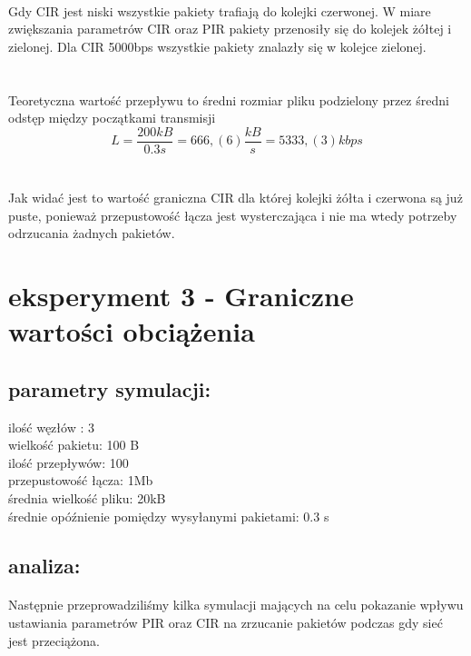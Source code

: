 \documentclass[a4paper]{article}
\begin{document}
\paragraph{}
Gdy CIR jest niski wszystkie pakiety trafiają do kolejki czerwonej. W miare zwiększania parametrów CIR oraz PIR pakiety przenosiły się do kolejek żółtej i zielonej. Dla CIR 5000bps wszystkie pakiety znalazły się w kolejce zielonej.\\
\\

\paragraph{}
Teoretyczna wartość przepływu to średni rozmiar pliku podzielony przez średni odstęp między początkami transmisji\\
\[L = \frac{200kB} {0.3s} = 666,(6) \frac{kB} {s} = 5333,(3)kbps \]
\\

\paragraph{}
Jak widać jest to wartość graniczna CIR dla której kolejki żółta i czerwona są już puste, ponieważ przepustowość łącza jest wysterczająca i nie ma wtedy potrzeby odrzucania żadnych pakietów.

\section{eksperyment 3 - Graniczne wartości obciążenia}


\subsection{parametry symulacji:}

ilość węzłów : 3\\
wielkość pakietu: 100 B\\
ilość przepływów: 100\\
przepustowość łącza: 1Mb\\
średnia wielkość pliku: 20kB\\
średnie opóźnienie pomiędzy wysyłanymi pakietami: 0.3 s\\

\subsection{analiza:}

\paragraph{}
Następnie przeprowadziliśmy kilka symulacji mających na celu pokazanie wpływu ustawiania parametrów PIR oraz CIR na zrzucanie pakietów podczas gdy sieć jest przeciążona.
\end{document}
